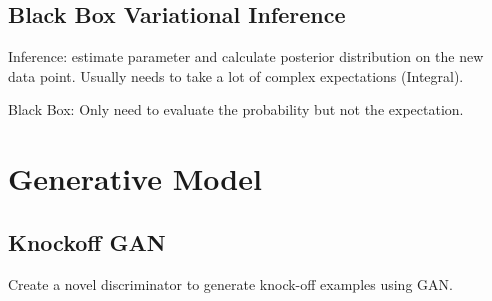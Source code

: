 \documentclass[10pt,a4paper]{article}
\begin{document}
\subsection{Black Box Variational Inference\cite{ranganath2014black}}
Inference: estimate parameter and calculate posterior distribution on the new data point. Usually needs to take a lot of complex expectations (Integral).

Black Box: Only need to evaluate the probability but not the expectation.
\section{Generative Model}
\subsection{Knockoff GAN}
Create a novel discriminator to generate knock-off examples using GAN.


\end{document}
